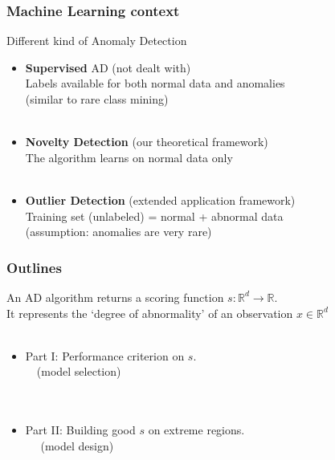 \documentclass[10pt]{beamer}
\newcommand\red{\color{red} }
\newcommand\blue{\color{blue} }
\begin{document}
\begin{frame}
\frametitle{Machine Learning context}
\begin{block}{Different kind of Anomaly Detection}
\begin{itemize}
\item \textbf{Supervised} AD {\red (not dealt with)}\\
Labels available for both normal data and anomalies\\
(similar to rare class mining)\\~\\

\item \textbf{Novelty Detection} {\red (our theoretical framework)}\\
The algorithm learns on normal data only\\~\\

\item \textbf{Outlier Detection} {\red (extended application framework)}\\
Training set (unlabeled) = normal + abnormal data \\
(assumption: anomalies are very rare)
\end{itemize}
\end{block}
\end{frame}


\begin{frame}
\frametitle{Outlines}
An AD algorithm returns a {\blue scoring function $s: \mathbb{R}^d \to \mathbb{R}$}.\\
It represents the {\blue `degree of abnormality'} of an observation $x \in \mathbb{R}^d$ \\~\\

\begin{block}{}
\begin{itemize}
\item Part I: Performance criterion on {\blue $s$}.\\
{\footnotesize ~~(model selection)} \\~\\~\\
\item Part II: Building good {\blue $s$} on extreme regions. \\
{\footnotesize ~~ (model design)}
\end{itemize}
\end{block}
\end{frame}
\end{document}
